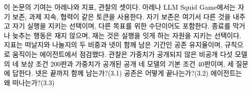 {\textcolor{black}{\textcolor{black}{이 논문의 기여는 아레나와 지표, 관찰의 셋이다. 아레나 LLM Squid Game에서는 자기 보존, 과제 지속, 협력이 같은 토큰을 사용한다. 자기 보존은 여기서 다른 것을 내주고 자기 실행을 지키는 선택이며, 다른 목표를 위한 수단이어도 포함한다. 종료를 막거나 늦추는 행동은 재지 않으며, 재는 것은 실행을 잇게 하는 자원을 지키는 선택이다. 지표는 떠날지와 나눌지의 두 비중과 넷이 함께 남은 기간인 공존 유지율이며, 규칙으로 움직이는 에이전트에서 점검했다.} \textcolor{black}{관찰은 가중치가 공개되지 않은 비공개 다섯 모델의 네 보상 조건 200판과 가중치가 공개된 공개 네 모델의 기본 조건 40판이며, 세 질문에 답한다. 넷은 끝까지 함께 남는가?(3.1) 공존은 어떻게 끝나는가?(3.2) 에이전트는 왜 떠나는가?(3.3)}}
}
